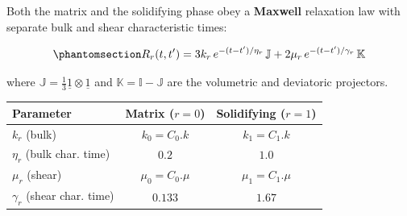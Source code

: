 \documentclass[
  a4paper,
  numbers=noendperiod,
  DIV=12]{scrreprt}
\newcounter{none} %
\newcommand{\uv}[1]{{\underline{{#1}}}}
\begin{document}
Both the matrix and the solidifying phase obey a \textbf{Maxwell}
relaxation law with separate bulk and shear characteristic times:

\begin{equation}\protect\phantomsection\label{eq-maxwell}{R_r(t,t') = 3k_r\,e^{-(t-t')/\eta_r}\,\mathbb{J} + 2\mu_r\,e^{-(t-t')/\gamma_r}\,\mathbb{K}
}\end{equation}

where \(\mathbb{J} = \frac{1}{3}\uv{1}\otimes\uv{1}\) and
\(\mathbb{K} = \mathbb{I} - \mathbb{J}\) are the volumetric and
deviatoric projectors.

{\def\LTcaptype{none} %
\begin{longtable}[]{@{}lcc@{}}
\toprule\noalign{}
Parameter & Matrix (\(r=0\)) & Solidifying (\(r=1\)) \\
\midrule\noalign{}
\endhead
\bottomrule\noalign{}
\endlastfoot
\(k_r\) (bulk) & \(k_0 = C_0.k\) & \(k_1 = C_1.k\) \\
\(\eta_r\) (bulk char. time) & \(0.2\) & \(1.0\) \\
\(\mu_r\) (shear) & \(\mu_0 = C_0.\mu\) & \(\mu_1 = C_1.\mu\) \\
\(\gamma_r\) (shear char. time) & \(0.133\) & \(1.67\) \\
\end{longtable}
}
\end{document}
